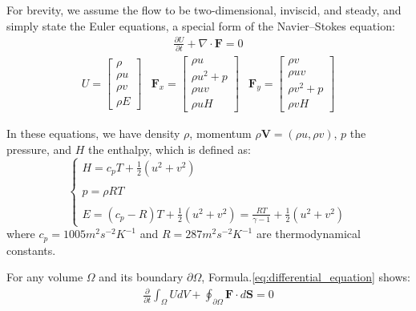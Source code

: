 \documentclass[%
 reprint,
 amsmath,amssymb,
pra,
]{revtex4-1}
\begin{document}
For brevity, we assume the flow to be two-dimensional, inviscid, and steady, and simply state the Euler equations\cite{euler1757principes, hirsch2007numerical, anderson2010fundamentals}, a special form of the Navier--Stokes equation:
\begin{align}\label{eq:differential_equation}
\frac{\partial U}{\partial t} + \nabla \cdot \bm{F} = 0
\end{align}
\begin{equation}
\begin{array}{ccc}
U = \left[
\begin{array}{c}
\rho\\
\rho u\\
\rho v\\
\rho E
\end{array}
\right]
&
\bm{F}_x = \left[
\begin{array}{c}
\rho u\\
\rho u^2 + p\\
\rho u v\\
\rho u H
\end{array}
\right]
&
\bm{F}_y = \left[
\begin{array}{c}
\rho v\\
\rho u v\\
\rho v^2 + p\\
\rho v H
\end{array}
\right]
\end{array}
\end{equation}

In these equations, we have density $\rho$, momentum $\rho\bm{V}=\left(\rho u, \rho v\right)$, $p$ the pressure, and $H$ the enthalpy, which is defined as:
\begin{equation}
\left\{
\begin{array}{l}
	H =  c_p T + \frac{1}{2}\left(u^2 + v^2\right)\\
	\\
	p =  \rho R T\\
	\\
	E = \left(c_p - R\right) T + \frac{1}{2}\left(u^2 + v^2\right) = \frac{R T}{\gamma - 1} + \frac{1}{2}\left(u^2 + v^2\right)
\end{array}
\right.
\end{equation}
where $c_p = 1005 m^2 s^{-2} K^{-1}$ and $R = 287 m^2 s^{-2} K^{-1}$ are thermodynamical constants.

For any volume $\Omega$ and its boundary $\partial\Omega$, Formula.\ref{eq:differential_equation} shows:
\begin{align}\label{eq:integral_equation}
	\frac{\partial}{\partial t}\int_\Omega U d V + \oint_{\partial \Omega} \bm{F} \cdot d \bm{S} = 0
\end{align}
\end{document}
